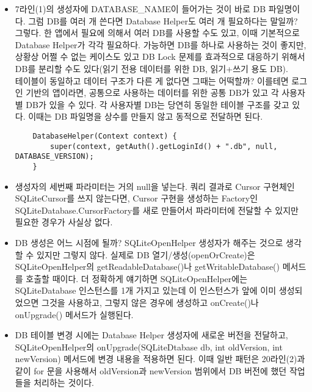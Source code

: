 \begin{itemize}
\item 7라인(1)의 생성자에 DATABASE\_NAME이 들어가는 것이 바로 DB 파일명이다.
그럼 DB를 여러 개 쓴다면 Database Helper도 여러 개 필요하다는 말일까? 그렇다. 한 앱에서 필요에 의해서 여러 DB를 사용할 수도 있고, 이때 기본적으로 Database Helper가 각각 필요하다.
가능하면 DB를 하나로 사용하는 것이 좋지만, 상황상 어쩔 수 없는 케이스도 있고 DB Lock 문제를 효과적으로 대응하기 위해서 DB를 분리할 수도 있다(읽기 전용 데이터를 위한 DB, 읽기+쓰기 용도 DB).\\

테이블이 동일하고 데이터 구조가 다른 게 없다면 그때는 어떡할까? 이를테면 로그인 기반의 앱이라면, 공통으로 사용하는 데이터를 위한 공통 DB가 있고 각 사용자별 DB가 있을 수 있다. 각 사용자별 DB는 당연히 동일한 테이블 구조를 갖고 있다. 이때는 DB 파일명을 상수를 만들지 않고 동적으로 전달하면 된다.
\begin{verbatim}
    DatabaseHelper(Context context) {
        super(context, getAuth().getLoginId() + ".db", null, DATABASE_VERSION);
    }
\end{verbatim}

\item 생성자의 세번째 파라미터는 거의 null을 넣는다. 
쿼리 결과로 Cursor 구현체인 SQLiteCursor를 쓰지 않는다면, Cursor 구현을 생성하는 Factory인 
SQLiteDatabase.CursorFactory를 새로 만들어서 파라미터에 전달할 수 있지만 필요한 경우가 사실상 없다.

\item DB 생성은 어느 시점에 될까? SQLiteOpenHelper 생성자가 해주는 것으로 생각할 수 있지만 그렇지 않다.
실제로 DB 열기/생성(openOrCreate)은 SQLiteOpenHelper의 getReadableDatabase()나 getWritableDatabase() 메서드를 호출할 때이다.
더 정확하게 얘기하면 SQLiteOpenHelper에는 SQLiteDatabase 인스턴스를 1개 가지고 있는데 이 인스턴스가 앞에 이미 생성되었으면 그것을 사용하고, 그렇지 않은 경우에 생성하고 onCreate()나 onUpgrade() 메서드가 실행된다.

\item DB 테이블 변경 시에는 Database Helper 생성자에 새로운 버전을 전달하고, 
SQLiteOpenHelper의 onUpgrade(SQLiteDtabase db, int oldVersion, int newVersion) 메서드에 변경 내용을 적용하면 된다. 이때 일반 패턴은 20라인(2)과 같이 for 문을 사용해서 oldVersion과 newVersion 범위에서 DB 버전에 했던 작업들을 처리하는 것이다.


\end{itemize}
